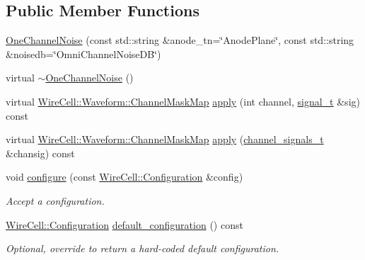 \subsection*{Public Member Functions}
\begin{DoxyCompactItemize}
\item 
\hyperlink{class_wire_cell_1_1_sig_proc_1_1_protodune_1_1_one_channel_noise_a31da7da5bc68c93fc56f22135fd0595c}{One\+Channel\+Noise} (const std\+::string \&anode\+\_\+tn=\char`\"{}Anode\+Plane\char`\"{}, const std\+::string \&noisedb=\char`\"{}Omni\+Channel\+Noise\+DB\char`\"{})
\item 
virtual \hyperlink{class_wire_cell_1_1_sig_proc_1_1_protodune_1_1_one_channel_noise_ab1bfb3d77b45634fbaa594e8c33a891f}{$\sim$\+One\+Channel\+Noise} ()
\item 
virtual \hyperlink{namespace_wire_cell_1_1_waveform_a18b9ae61c858e340252ba3ac83ac3bc0}{Wire\+Cell\+::\+Waveform\+::\+Channel\+Mask\+Map} \hyperlink{class_wire_cell_1_1_sig_proc_1_1_protodune_1_1_one_channel_noise_a7d891c87a8867d57fc4b6ac86d226876}{apply} (int channel, \hyperlink{class_wire_cell_1_1_i_channel_filter_a434ed96cc4b805fa0eeec14f9f8d85e9}{signal\+\_\+t} \&sig) const
\item 
virtual \hyperlink{namespace_wire_cell_1_1_waveform_a18b9ae61c858e340252ba3ac83ac3bc0}{Wire\+Cell\+::\+Waveform\+::\+Channel\+Mask\+Map} \hyperlink{class_wire_cell_1_1_sig_proc_1_1_protodune_1_1_one_channel_noise_ae4c1803fb4849e5a9e73f65d79fdc909}{apply} (\hyperlink{class_wire_cell_1_1_i_channel_filter_a44de35ce47701d84cd45393c6bcd5e2f}{channel\+\_\+signals\+\_\+t} \&chansig) const
\item 
void \hyperlink{class_wire_cell_1_1_sig_proc_1_1_protodune_1_1_one_channel_noise_acf32ea2e00ad1f3e39e987aa30ca60c3}{configure} (const \hyperlink{namespace_wire_cell_a9f705541fc1d46c608b3d32c182333ee}{Wire\+Cell\+::\+Configuration} \&config)
\begin{DoxyCompactList}\small\item\em Accept a configuration. \end{DoxyCompactList}\item 
\hyperlink{namespace_wire_cell_a9f705541fc1d46c608b3d32c182333ee}{Wire\+Cell\+::\+Configuration} \hyperlink{class_wire_cell_1_1_sig_proc_1_1_protodune_1_1_one_channel_noise_a2f0a41f11d154f971da95d9127be594d}{default\+\_\+configuration} () const
\begin{DoxyCompactList}\small\item\em Optional, override to return a hard-\/coded default configuration. \end{DoxyCompactList}\end{DoxyCompactItemize}
